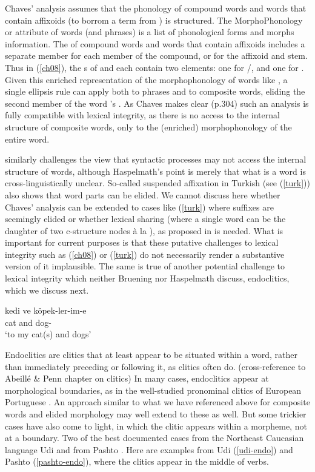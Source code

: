 \documentclass[output=paper]{langsci/langscibook}
\begin{document}
Chaves' analysis assumes that the phonology of compound words and words that contain affixoids (to borrom a term from \citealt{Booij2005}) is structured. The MorphoPhonology or  attribute of words (and phrases) is a list of phonological forms and morphs information. The  of compound words and words that contain affixoids includes a separate member for each member of the compound, or for the affixoid and stem.  Thus in (\ref{ch08}), the s of  and  each contain two elements: one for /, and one for . Given this enriched representation of the morphophonology of words like , a single ellipsis rule can apply both to phrases and to composite words, eliding the second member of the word 's . As Chaves makes clear (p.304) such an analysis is fully compatible with lexical integrity, as there is no access to the internal structure of composite words, only to the (enriched) morphophonology of the entire word.

\citet{Haspelmath2011} similarly challenges the view that syntactic processes may not access the internal structure of words, although Haspelmath's point is merely that what is a word is cross-linguistically unclear. So-called suspended affixation in Turkish (see (\ref{turk})) also shows that word parts can be elided. We cannot discuss here whether Chaves' analysis can be extended to cases like (\ref{turk}) where suffixes are seemingly elided or whether lexical sharing (where a single word can be the daughter of two c-structure nodes \`a la \citealt{McCawley1982}), as proposed in \citet{Broadwell2008} is needed. What is important for current purposes is that these putative challenges to lexical integrity such as (\ref{ch08}) or (\ref{turk}) do not necessarily render a substantive version of it implausible. The same is true of another potential challenge to lexical integrity which neither Bruening nor Haspelmath discuss, endoclitics, which we discuss next.

\begin{exe}
	\ex\label{turk}
	\gll kedi ve köpek-ler-im-e \\
	cat and dog- \\
	\glt `to my cat(s) and dogs'	
\end{exe}


Endoclitics are clitics that at least appear to be situated within a word, rather than immediately preceding or following it, as clitics often do. (cross-reference to Abeill\'{e} \& Penn chapter on clitics)
In many cases, endoclitics appear at morphological boundaries, as in the well-studied pronominal clitics of European Portuguese \citep{Crysmann2000a}. An approach similar to what we have referenced above for composite words and elided morphology may well extend to these as well. But some trickier cases have also come to light, in which the clitic appears within a morpheme, not at a boundary. Two of the best documented cases from the Northeast Caucasian language Udi \citep{Harris2000} and from Pashto \citep{Tegey1977,Roberts2000,Dost2007}.
Here are examples from Udi (\ref{udi-endo}) and Pashto (\ref{pashto-endo}), where the clitics appear in the middle of verbs.
\end{document}
